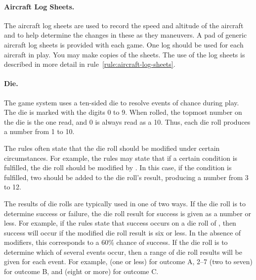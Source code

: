 {\paragraph{Aircraft Log Sheets.} The aircraft log sheets are used to record the speed and altitude of the aircraft and to help determine the changes in these as they maneuvers. A pad of generic aircraft log sheets is provided with each game. One log should be used for each aircraft in play. You may make copies of the sheets. The use of the log sheets is described in more detail in rule~\ref{rule:aircraft-log-sheets}.

\paragraph{Die.} The game system uses a ten-sided die to resolve events of chance during play. The die is marked with the digits 0 to 9. When rolled, the topmost number on the die is the one read, and 0 is always read as a 10. Thus, each die roll produces a number from 1 to 10.

The rules often state that the die roll should be modified under certain circumstances. For example, the rules may state that if a certain condition is fulfilled, the die roll should be modified by . In this case, if the condition is fulfilled, two should be added to the die roll's result, producing a number from 3 to 12.

The results of die rolls are typically used in one of two ways. If the die roll is to determine success or failure, the die roll result for success is given as a number or less. For example, if the rules state that success occurs on a die roll of , then success will occur if the modified die roll result is six or less. In the absence of modifiers, this corresponds to a 60\% chance of success. If the die roll is to determine which of several events occur, then a range of die roll results will be given for each event. For example,  (one or less) for outcome A, 2--7 (two to seven) for outcome B, and  (eight or more) for outcome C.


}




